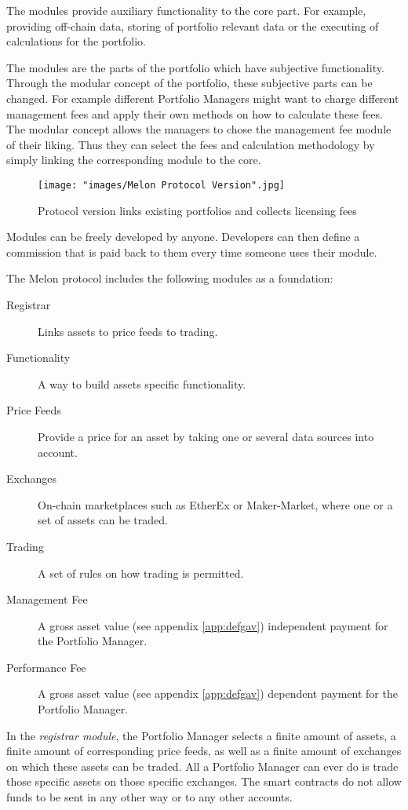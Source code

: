\documentclass[9pt,oneside]{amsart}
\theoremstyle{plain}
\begin{document}
\begin{multicols}{2}
The modules provide auxiliary functionality to the core part. For example, providing off-chain data, storing of portfolio relevant data or the executing of calculations for the portfolio.

The modules are the parts of the portfolio which have subjective functionality. Through the modular concept of the portfolio, these subjective parts can be changed. For example different Portfolio Managers might want to charge different management fees and apply their own methods on how to calculate these fees. The modular concept allows the managers to chose the management fee module of their liking. Thus they can select the fees and calculation methodology by simply linking the corresponding module to the core.

\begin{figure*}[ht!]
	\centering
	\texttt{[image: "images/Melon Protocol Version".jpg]}
	\caption{Protocol version links existing portfolios and collects licensing fees \label{fig:protocolversion}}
\end{figure*}

Modules can be freely developed by anyone. Developers can then define a commission that is paid back to them every time someone uses their module.

The Melon protocol includes the following modules as a foundation:

\begin{description}
	\item[Registrar] Links assets to price feeds to trading.
	\item[Functionality] A way to build assets specific functionality.
	\item[Price Feeds] Provide a price for an asset by taking one or several data sources into account.    
	\item[Exchanges] On-chain marketplaces such as EtherEx\cite{etherex} or Maker-Market\cite{maker-market}, where one or a set of assets can be traded.
	\item[Trading] A set of rules on how trading is permitted.
	\item[Management Fee] A gross asset value (see appendix \ref{app:defgav}) independent payment for the Portfolio Manager.
	\item[Performance Fee] A gross asset value (see appendix \ref{app:defgav}) dependent payment for the Portfolio Manager.
\end{description}

In the \textit{registrar module}, the Portfolio Manager selects a finite amount of assets, a finite amount of corresponding price feeds, as well as a finite amount of exchanges on which these assets can be traded. All a Portfolio Manager can ever do is trade those specific assets on those specific exchanges. The smart contracts do not allow funds to be sent in any other way or to any other accounts. 


\end{multicols}
\end{document}
